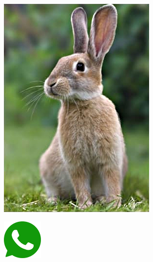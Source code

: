 {\begin{multicols}{3}
\begin{center}
	\includegraphics[height=.5\textheight]{./IMG-GIT/coelhinho.jpeg}
\end{center}
\begin{flushright}
	\includegraphics[height=20mm]{./IMG-GIT/whatsapp.png}
\end{flushright}

	\vfill	
	\columnbreak


\end{multicols}}
